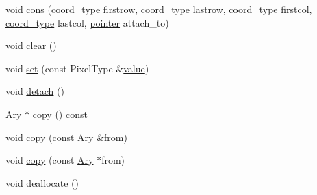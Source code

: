 \begin{CompactItemize}
\item 
void \hyperlink{structutls_1_1Ary_413d558b47b4d16b13ed54809d04e41a}{cons} (\hyperlink{structutls_1_1Ary_907420b899d180bd0ae87c3995316f18}{coord\_\-type} firstrow, \hyperlink{structutls_1_1Ary_907420b899d180bd0ae87c3995316f18}{coord\_\-type} lastrow, \hyperlink{structutls_1_1Ary_907420b899d180bd0ae87c3995316f18}{coord\_\-type} firstcol, \hyperlink{structutls_1_1Ary_907420b899d180bd0ae87c3995316f18}{coord\_\-type} lastcol, \hyperlink{structutls_1_1Ary_9eb735fe995ca9b5faaef9b176a08583}{pointer} attach\_\-to)
\item 
void \hyperlink{structutls_1_1Ary_2e905f4c6d346e123ed372fcea624c59}{clear} ()
\item 
void \hyperlink{structutls_1_1Ary_5033e49743bcf59db9b4edc9a3102c58}{set} (const Pixel\-Type \&\hyperlink{structutls_1_1Ary_551039ff12448ccd561c82108ed16190}{value})
\item 
void \hyperlink{structutls_1_1Ary_bccc51fad2fc93d1882f94fad6017017}{detach} ()
\item 
\hyperlink{structutls_1_1Ary}{Ary} $\ast$ \hyperlink{structutls_1_1Ary_5a5a2f509832fb8cce2470f2cb5e3eaa}{copy} () const 
\item 
void \hyperlink{structutls_1_1Ary_960a605e93700bba86d9828b0a26ee68}{copy} (const \hyperlink{structutls_1_1Ary}{Ary} \&from)
\item 
void \hyperlink{structutls_1_1Ary_c0025d5b957bd2016bd0b859190029a0}{copy} (const \hyperlink{structutls_1_1Ary}{Ary} $\ast$from)
\item 
void \hyperlink{structutls_1_1Ary_c3fc175e7c69a1702961f4036019160d}{deallocate} ()
\end{CompactItemize}
